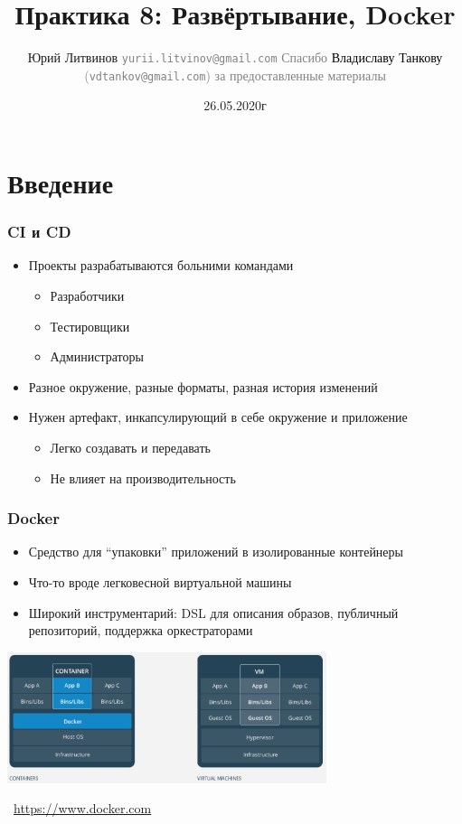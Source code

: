\documentclass[xetex,mathserif,serif]{beamer}
\title{Практика 8: Развёртывание, Docker}
\author[Юрий Литвинов]{Юрий Литвинов \newline
    \textcolor{gray}{\small\texttt{yurii.litvinov@gmail.com}} \newline
    \textcolor{gray}{\small Спасибо \textcolor{black}{Владиславу Танкову} (\texttt{vdtankov@gmail.com}) за  предоставленные материалы}
}
\date{26.05.2020г}
\newcommand{\attribution}[1] {
    \vspace{-5mm}\begin{flushright}\begin{scriptsize}\textcolor{gray}{\textcopyright\, #1}\end{scriptsize}\end{flushright}
}
\begin{document}
    \frame{\titlepage}

    \section{Введение}

    \begin{frame}
        \frametitle{CI и CD}
        \begin{itemize}
            \item Проекты разрабатываются больними командами
            \begin{itemize}
                \item Разработчики
                \item Тестировщики
                \item Администраторы
            \end{itemize}
            \item Разное окружение, разные форматы, разная история изменений
            \item Нужен артефакт, инкапсулирующий в себе окружение и приложение
            \begin{itemize}
                \item Легко создавать и передавать
                \item Не влияет на производительность
            \end{itemize}
        \end{itemize}
    \end{frame}

    \begin{frame}
        \frametitle{Docker}
        \begin{itemize}
            \item Средство для ``упаковки'' приложений в изолированные контейнеры
            \item Что-то вроде легковесной виртуальной машины
            \item Широкий инструментарий: DSL для описания образов, публичный репозиторий, поддержка оркестраторами
        \end{itemize}
        \begin{center}
            \includegraphics[width=0.7\textwidth]{docker.png}
            \attribution{\url{https://www.docker.com}}
        \end{center}
    \end{frame}
\end{document}
